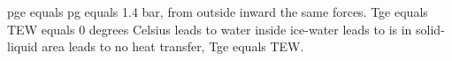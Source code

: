 pge equals pg equals 1.4 bar, from outside inward the same forces.  
Tge equals TEW equals 0 degrees Celsius leads to water inside ice-water leads to is in solid-liquid area leads to no heat transfer, Tge equals TEW.